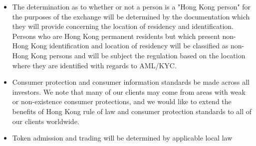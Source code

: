 \begin{itemize}
  \item The determination as to whether or not a person is a "Hong
    Kong person" for the purposes of the exchange will be determined
    by the documentation which they will provide concerning the location
    of residency and identification.  Persons who are Hong Kong
    permanent residents but which present non-Hong Kong identification and
    location of residency will be classified as non-Hong Kong persons
    and will be subject the regulation based on the location where
    they are identified with regards to AML/KYC.
  \item Consumer protection and consumer information standards be made
    across all investors.  We note that many of our clients may come
    from areas with weak or non-existence consumer protections, and we
    would like to extend the benefits of Hong Kong rule of law and
    consumer protection standards to all of our clients worldwide.
  \item Token admission and trading will be determined by applicable
    local law
\end{itemize}

